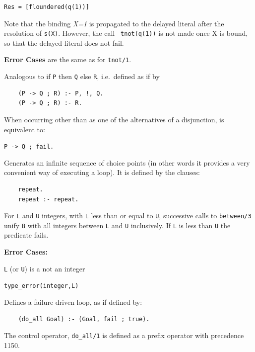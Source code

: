 \begin{description}
\begin{verbatim}
Res = [floundered(q(1))]
\end{verbatim}
Note that the binding {\em X=1} is propagated to the delayed literal
after the resolution of {\tt s(X)}.  However, the call {\tt
  tnot(q(1))} is not made once X is bound, so that the delayed literal
does not fail.

{\bf Error Cases} are the same as for {\tt tnot/1}.


    Analogous to if {\tt P} then {\tt Q} else {\tt R}, i.e.\ defined as 
    if by
	\begin{center}
	\begin{minipage}{2.10in}
	\begin{verbatim}
	(P -> Q ; R) :- P, !, Q.
	(P -> Q ; R) :- R.
	\end{verbatim}
	\end{minipage}
	\end{center}

    When occurring other than as one of the alternatives of a disjunction,
    is equivalent to:
	\begin{center}
	{\tt P -> Q ; fail.}
	\end{center}

    Generates an infinite sequence of choice points (in other words it 
    provides a very convenient way of executing a loop). It is defined 
    by the clauses:
    \begin{center}
    \begin{minipage}{1.5in}
    \begin{verbatim}
	repeat.
	repeat :- repeat.
    \end{verbatim}
    \end{minipage}
    \end{center}

%
For {\tt L} and {\tt U} integers, with {\tt L} less than or equal to
{\tt U}, successive calls to {\tt between/3} unify {\tt B} with all
integers between {\tt L} and {\tt U} inclusively.  If {\tt L} is less
than {\tt U} the predicate fails.

{\bf Error Cases:}
\bi
\item 	{\tt L} (or {\tt U}) is a not an integer
\bi
\item 	{\tt type\_error(integer,L)}
\ei
\ei

Defines a failure driven loop, as if defined by:
	\begin{center}
	\begin{minipage}{2.10in}
	\begin{verbatim}
	(do_all Goal) :- (Goal, fail ; true).
	\end{verbatim}
	\end{minipage}
	\end{center}
The control operator, {\tt do\_all/1} is defined as a prefix operator
with precedence 1150.


\end{description}
